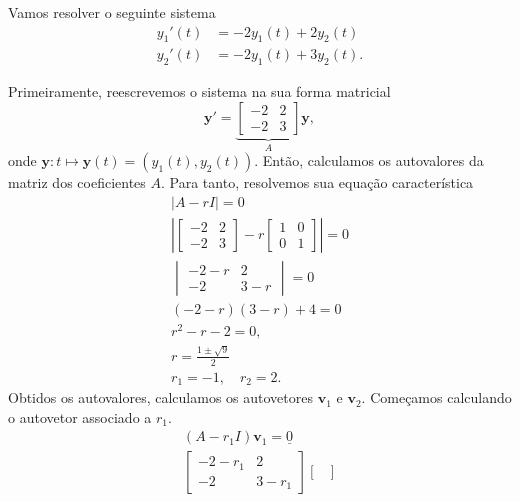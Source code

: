 \begin{ex}\label{ex:edosis1_eqh_avd}
  Vamos resolver o seguinte sistema
  \begin{align}\label{eq:ex_edosis1_eqh_avd}
    y_1'(t) &= -2y_1(t) + 2y_2(t) \\
    y_2'(t) &= -2y_1(t) + 3y_2(t).
  \end{align}

  Primeiramente, reescrevemos o sistema na sua forma matricial
  \begin{equation}
    \pmb{y}' =
    \underbrace{\begin{bmatrix}
      -2 & 2 \\
      -2 & 3
    \end{bmatrix}}_{A}
    \pmb{y},
  \end{equation}
  onde $\pmb{y}: t\mapsto \pmb{y}(t) = (y_1(t), y_2(t))$. Então, calculamos os autovalores da matriz dos coeficientes $A$. Para tanto, resolvemos sua equação característica
  \begin{gather}
    |A-rI| = 0 \\
    \left|
      \begin{bmatrix}
        -2 & 2 \\
        -2 & 3
      \end{bmatrix}
      -r
      \begin{bmatrix}
        1 & 0 \\
        0 & 1
      \end{bmatrix}
    \right| = 0 \\
    \begin{vmatrix}
      -2 - r & 2 \\
      -2 & 3 - r
    \end{vmatrix} = 0 \\
    (-2-r)(3-r) + 4 = 0 \\
    r^2 - r - 2 =  0,\\
    r = \frac{1 \pm \sqrt{9}}{2} \\
    r_1=-1,\quad r_2=2.
  \end{gather}
  Obtidos os autovalores, calculamos os autovetores $\pmb{v}_1$ e $\pmb{v}_2$. Começamos calculando o autovetor associado a $r_1$.
  \begin{gather}
    (A-r_1I)\pmb{v}_1 = \underline{0} \\
    \begin{bmatrix}
      -2-r_1 & 2 \\
      -2 & 3-r_1
    \end{bmatrix}
    \begin{bmatrix}

\end{bmatrix}
\end{gather}
\end{ex}
